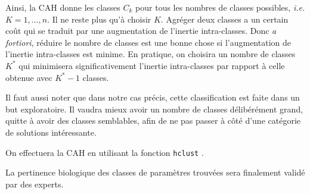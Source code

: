 Ainsi, la CAH donne les classes $C_k$ pour tous les nombres de classes possibles, \emph{i.e.} $K = 1,\ldots, n$.
Il ne reste plus qu'à choisir $K$.
Agréger deux classes a un certain coût qui se traduit par une augmentation de l'inertie intra-classes.
Donc \emph{a fortiori}, réduire le nombre de classes est une bonne chose si l'augmentation de l'inertie intra-classes est minime.
En pratique, on choisira un nombre de classes $K^*$ qui minimisera significativement l'inertie intra-classes par rapport à celle obtenue avec $K^* -1$ classes.

Il faut aussi noter que dans notre cas précis, cette classification est faite dans un but exploratoire. 
Il vaudra mieux avoir un nombre de classes délibérément grand, quitte à avoir des classes semblables, afin de ne pas passer à côté d'une catégorie de solutions intéressante.

On effectuera la CAH en utilisant la fonction \texttt{hclust} \citep{R}.

La pertinence biologique des classes de paramètres trouvées sera finalement validé par des experts.





